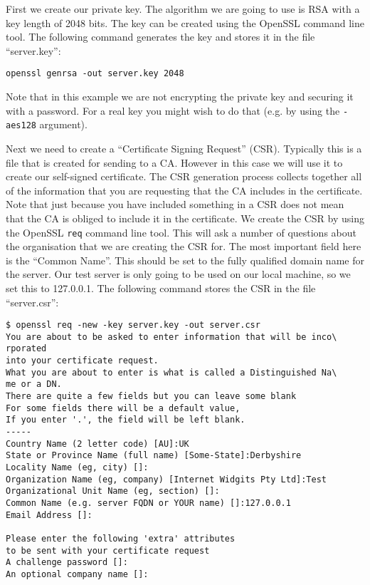 First we create our private key. The algorithm we are going to use is  RSA with
a key length of 2048 bits. The key can be created using the OpenSSL command line
tool. The following command generates the key and stores it in the file 
``server.key'':
\begin{verbatim}
openssl genrsa -out server.key 2048
\end{verbatim}

Note that in this example we are not encrypting the private key and securing it 
with a password. For a real key you might wish to do that (e.g. by using the 
\verb!-aes128! argument).

Next we need to create a ``Certificate Signing Request'' (CSR). Typically this 
is a file that is created for sending to a CA. However in this case we will use 
it to create our self-signed certificate. The CSR generation process collects 
together all of the information that you are requesting that the CA includes in 
the certificate. Note that just because you have included something in a CSR 
does not mean that the CA is obliged to include it in the certificate. We 
create the CSR by using the OpenSSL \verb!req! command line tool. This will ask 
a number of questions about the organisation that we are creating the CSR for. 
The most important field here is the ``Common Name''. This should be set to the 
fully qualified domain name for the server. Our test server is only going to be 
used on our local machine, so we set this to 127.0.0.1. The following command 
stores the CSR in the file ``server.csr'':

\begin{verbatim}
$ openssl req -new -key server.key -out server.csr
You are about to be asked to enter information that will be inco\
rporated
into your certificate request.
What you are about to enter is what is called a Distinguished Na\
me or a DN.
There are quite a few fields but you can leave some blank
For some fields there will be a default value,
If you enter '.', the field will be left blank.
-----
Country Name (2 letter code) [AU]:UK
State or Province Name (full name) [Some-State]:Derbyshire
Locality Name (eg, city) []:
Organization Name (eg, company) [Internet Widgits Pty Ltd]:Test
Organizational Unit Name (eg, section) []:
Common Name (e.g. server FQDN or YOUR name) []:127.0.0.1
Email Address []:

Please enter the following 'extra' attributes
to be sent with your certificate request
A challenge password []:
An optional company name []:
\end{verbatim}

